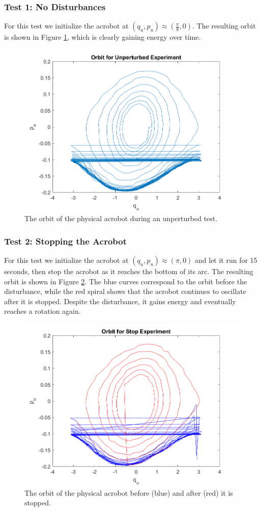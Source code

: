 \subsubsection*{Test 1: No Disturbances}
For this test we initialize the acrobot at 
\((q_u,p_u) \approx \left(\frac{\pi}{8},0\right)\). 
The resulting orbit is shown in Figure \ref{fig:acrobot-unperturbed-orbit},
which is clearly gaining energy over time.

\begin{figure}[ht]
    \centering
    \includegraphics[width=0.5\linewidth]{images/acrobot_unperturbed_orbit.png}
    \caption{The orbit of the physical acrobot during an unperturbed test.}
    \label{fig:acrobot-unperturbed-orbit}
\end{figure}

\subsubsection*{Test 2: Stopping the Acrobot}
For this test we initialize the acrobot at 
\((q_u,p_u) \approx \left(\pi,0\right)\) and let it run for 15
seconds, then stop the acrobot as it reaches the bottom of its arc.
The resulting orbit is shown in Figure \ref{fig:acrobot-stopped-orbit}.
The blue curves correspond to the orbit before the disturbance, while the red
spiral shows that the acrobot continues to oscillate after it is stopped.
Despite the disturbance, it gains energy and eventually reaches a rotation
again.

\begin{figure}[ht]
    \centering
    \includegraphics[width=0.5\linewidth]{images/acrobot_stopped_orbit.png}
    \caption{The orbit of the physical acrobot before (blue) and after (red) it
    is stopped.}
    \label{fig:acrobot-stopped-orbit}
\end{figure}

